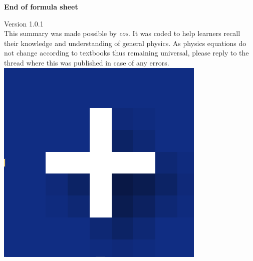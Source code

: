\documentclass[10pt,landscape]{article}
\begin{document}
\begin{multicols*}{3}
\begin{center}
     {\textbf{End of formula sheet}} \\
\end{center}
Version 1.0.1 \\
This summary was made possible by \textit{cos}. It was coded to help learners recall their knowledge and understanding of general physics. As physics equations do not change according to textbooks thus remaining universal, please reply to the thread where this was published in case of any errors.
\includegraphics[scale=0.05]{blueicon.eps}
\end{multicols*}
\end{document}

